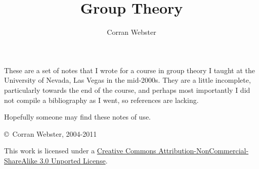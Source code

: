 \documentclass[10pt]{book}
\title{Group Theory}
\author{Corran Webster}
\theoremstyle{break}
\begin{document}
\maketitle
{}

These are a set of notes that I wrote for a course in group theory I taught at
the University of Nevada, Las Vegas in the mid-2000s.  They are a little
incomplete, particularly towards the end of the course, and perhaps most
importantly I did not compile a bibliography as I went, so references are
lacking.

Hopefully someone may find these notes of use.

\bigskip

\noindent \copyright\ Corran Webster, 2004-2011

\medskip

\noindent This work is licensed under a
\href{http://creativecommons.org/licenses/by-nc-sa/3.0/}{Creative Commons
Attribution-NonCommercial-ShareAlike 3.0 Unported License}.


\tableofcontents

\newpage


\pagestyle{draft}









\printindex
\end{document}
